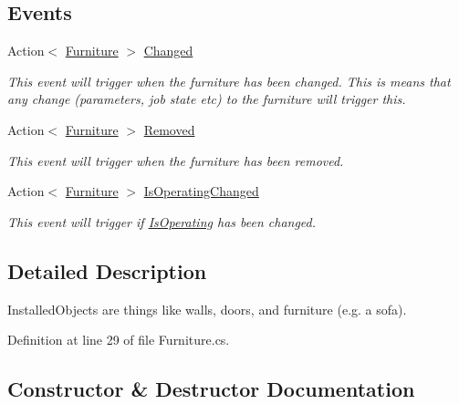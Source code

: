 \subsection*{Events}
\begin{DoxyCompactItemize}
\item 
Action$<$ \hyperlink{class_furniture}{Furniture} $>$ \hyperlink{class_furniture_a5d5652c9eac3ef6e0cf796eaf3cc9a67}{Changed}
\begin{DoxyCompactList}\small\item\em This event will trigger when the furniture has been changed. This is means that any change (parameters, job state etc) to the furniture will trigger this. \end{DoxyCompactList}\item 
Action$<$ \hyperlink{class_furniture}{Furniture} $>$ \hyperlink{class_furniture_a253700b462c0e22ade21918a314cab76}{Removed}
\begin{DoxyCompactList}\small\item\em This event will trigger when the furniture has been removed. \end{DoxyCompactList}\item 
Action$<$ \hyperlink{class_furniture}{Furniture} $>$ \hyperlink{class_furniture_a29f6e5c52a936590518b4a5f281ea26e}{Is\+Operating\+Changed}
\begin{DoxyCompactList}\small\item\em This event will trigger if \hyperlink{class_furniture_addc32913065ddd0ee4660b2de3f84a42}{Is\+Operating} has been changed. \end{DoxyCompactList}\end{DoxyCompactItemize}


\subsection{Detailed Description}
Installed\+Objects are things like walls, doors, and furniture (e.\+g. a sofa). 



Definition at line 29 of file Furniture.\+cs.



\subsection{Constructor \& Destructor Documentation}
\mbox{\label{class_furniture_a126d329d48ac7f41a8567d400c0a2598}} 
